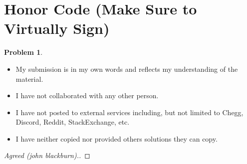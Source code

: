 \documentclass[11pt]{article}
\theoremstyle{definition}
\theoremstyle{definition}
\newtheorem{required}{Problem}
\theoremstyle{definition}
\begin{document}
\section{Honor Code (Make Sure to Virtually Sign)} \label{HonorCode}

\begin{required}
\noindent 
\begin{itemize}
\item My submission is in my own words and reflects my understanding of the material.
\item I have not collaborated with any other person.
\item I have not posted to external services including, but not limited to Chegg, Discord, Reddit, StackExchange, etc.
\item I have neither copied nor provided others solutions they can copy.
\end{itemize}

\end{required}

\begin{proof}[Agreed (john blackburn).]
\end{proof}


\newpage
\end{document}
